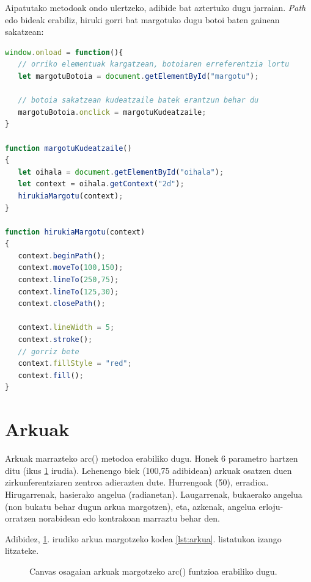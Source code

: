 Aipatutako metodoak ondo ulertzeko, adibide bat aztertuko dugu jarraian. \textit{Path} edo bideak erabiliz, hiruki gorri bat margotuko dugu botoi baten gainean sakatzean:

\begin{lstlisting}[language=JavaScript]
window.onload = function(){
   // orriko elementuak kargatzean, botoiaren erreferentzia lortu
   let margotuBotoia = document.getElementById("margotu");
   
   // botoia sakatzean kudeatzaile batek erantzun behar du
   margotuBotoia.onclick = margotuKudeatzaile;
}

function margotuKudeatzaile()
{
   let oihala = document.getElementById("oihala");
   let context = oihala.getContext("2d");
   hirukiaMargotu(context);
}

function hirukiaMargotu(context)
{
   context.beginPath();
   context.moveTo(100,150);
   context.lineTo(250,75);
   context.lineTo(125,30);
   context.closePath();
   
   context.lineWidth = 5;
   context.stroke();
   // gorriz bete
   context.fillStyle = "red";
   context.fill();
}
\end{lstlisting}

\section{Arkuak}\label{sec:arkuak}
Arkuak marrazteko arc()  metodoa erabiliko dugu. Honek 6 parametro hartzen ditu (ikus \ref{fig:canvasarkua} irudia). Lehenengo biek (100,75 adibidean) arkuak osatzen duen zirkunferentziaren zentroa adierazten dute. Hurrengoak (50), erradioa. Hirugarrenak, hasierako angelua (radianetan). Laugarrenak, bukaerako angelua (non bukatu behar dugun arkua margotzen), eta, azkenak, angelua erloju-orratzen norabidean edo kontrakoan marraztu behar den.

Adibidez, \ref{fig:canvasarkua}. irudiko arkua margotzeko kodea  \ref{lst:arkua}. listatukoa izango litzateke.

\begin{figure}[ht]
	\centering
{}
\caption{Canvas osagaian arkuak margotzeko arc() funtzioa erabiliko dugu.}
\label{fig:canvasarkua}
\end{figure}

